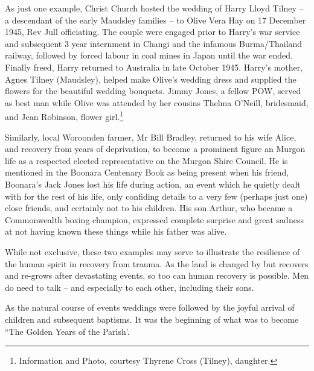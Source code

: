 As just one example, Christ Church hosted the wedding of Harry Lloyd Tilney -- a descendant of the early Maudsley families -- to Olive Vera Hay on 17 December 1945, Rev Jull officiating. The couple were engaged prior to Harry's war service and subsequent 3  year internment in Changi and the infamous Burma/Thailand railway, followed by forced labour in coal mines in Japan until the war ended. Finally freed, Harry returned to Australia in late October 1945. Harry's mother, Agnes Tilney (Maudsley), helped make Olive's wedding dress and supplied the flowers for the beautiful wedding bouquets. Jimmy Jones, a fellow POW, served as best man while Olive was attended by her cousins Thelma O'Neill, bridesmaid, and Jean Robinson, flower girl.\footnote{Information and Photo, courtesy Thyrene Cross (Tilney), daughter.}


Similarly, local Woroonden farmer, Mr Bill Bradley, returned to his wife Alice, and recovery from years of deprivation, to become a prominent figure an Murgon life as a respected elected representative on the Murgon Shire Council. He is mentioned in the Boonara Centenary Book as being present when his friend, Boonara's Jack Jones lost his life during action, an event which he quietly dealt with for the rest of his life, only confiding details to a very few (perhaps just one) close friends, and certainly not to his children. His son Arthur, who became a Commonwealth boxing champion, expressed complete surprise and great sadness at not having known these things while his father was alive.



While not exclusive, these two examples may serve to illustrate the resilience of the human spirit in recovery from trauma. As the land is changed by but recovers and re-grows after devastating events, so too can human recovery is possible. Men do need to talk -- and especially to each other, including their sons.



As the natural course of events weddings were followed by the joyful arrival of children and subsequent baptisms. It was the beginning of what was to become ``The Golden Years of the Parish'.



